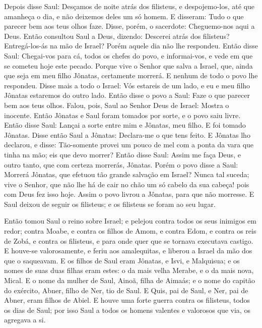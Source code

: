 Depois disse Saul: Desçamos de noite atrás dos filisteus, e
despojemo-los, até que amanheça o dia, e não deixemos deles um só
homem. E disseram: Tudo o que parecer bem aos teus olhos faze.
Disse, porém, o sacerdote: Cheguemo-nos aqui a Deus. Então
consultou Saul a Deus, dizendo: Descerei atrás dos filisteus?
Entregá-los-ás na mão de Israel? Porém aquele dia não lhe respondeu.
Então disse Saul: Chegai-vos para cá, todos os chefes do
povo, e informai-vos, e vede em que se cometeu hoje este pecado.
Porque vive o Senhor que salva a Israel, que, ainda que seja
em meu filho Jônatas, certamente morrerá. E nenhum de todo o povo
lhe respondeu. Disse mais a todo o Israel: Vós estareis de um
lado, e eu e meu filho Jônatas estaremos do outro lado. Então disse
o povo a Saul: Faze o que parecer bem aos teus olhos. Falou,
pois, Saul ao Senhor Deus de Israel: Mostra o inocente. Então
Jônatas e Saul foram tomados por sorte, e o povo saiu livre.
Então disse Saul: Lançai a sorte entre mim e Jônatas, meu
filho. E foi tomado Jônatas. Disse então Saul a Jônatas:
Declara-me o que tens feito. E Jônatas lho declarou, e disse:
Tão-somente provei um pouco de mel com a ponta da vara que tinha na
mão; eis que devo morrer? Então disse Saul: Assim me faça
Deus, e outro tanto, que com certeza morrerás, Jônatas. Porém
o povo disse a Saul: Morrerá Jônatas, que efetuou tão grande
salvação em Israel? Nunca tal suceda; vive o Senhor, que não lhe há
de cair no chão um só cabelo da sua cabeça! pois com Deus fez isso
hoje. Assim o povo livrou a Jônatas, para que não morresse. E
Saul deixou de seguir os filisteus; e os filisteus se foram ao seu
lugar.

Então tomou Saul o reino sobre Israel; e pelejou contra todos os
seus inimigos em redor; contra Moabe, e contra os filhos de Amom, e
contra Edom, e contra os reis de Zobá, e contra os filisteus, e para
onde quer que se tornava executava castigo. E houve-se
valorosamente, e feriu aos amalequitas, e liberou a Israel da mão
dos que o saqueavam. E os filhos de Saul eram Jônatas, e
Isvi, e Malquisua; e os nomes de suas duas filhas eram estes: o da
mais velha Merabe, e o da mais nova, Mical. E o nome da
mulher de Saul, Ainoã, filha de Aimaás; e o nome do capitão do
exército, Abner, filho de Ner, tio de Saul. E Quis, pai de
Saul, e Ner, pai de Abner, eram filhos de Abiel. E houve uma
forte guerra contra os filisteus, todos os dias de Saul; por isso
Saul a todos os homens valentes e valorosos que via, os agregava a
si.

\medskip


